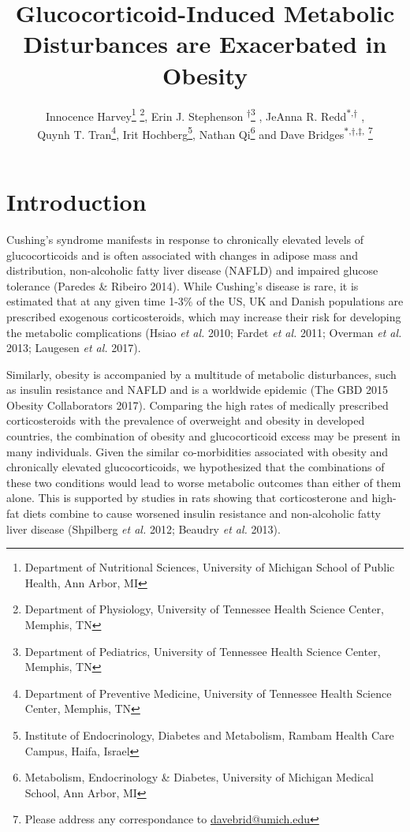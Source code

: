 \documentclass[11pt]{article} %
\date{} %
\title{Glucocorticoid-Induced Metabolic Disturbances are Exacerbated in
Obesity}
\author{Innocence Harvey\footnote{Department of Nutritional Sciences, University of Michigan School of Public Health, Ann Arbor, MI} \footnote{Department of Physiology, University of Tennessee Health Science Center, Memphis, TN}, Erin J. Stephenson \textsuperscript{$\dagger$}\footnote{Department of Pediatrics, University of Tennessee Health Science Center, Memphis, TN} , JeAnna R. Redd\textsuperscript{$\ast$,$\dagger$} ,\\ Quynh T. Tran\footnote{Department of Preventive Medicine, University of Tennessee Health Science Center, Memphis, TN},
Irit Hochberg\footnote{ Institute of Endocrinology, Diabetes and Metabolism, Rambam Health Care Campus, Haifa, Israel}, Nathan Qi\footnote{Metabolism, Endocrinology \& Diabetes, University of Michigan Medical School, Ann Arbor, MI} and Dave Bridges\textsuperscript{$\ast$,$\dagger$,$\ddagger$,} \footnote{Please address any correspondance to \href{mailto:davebrid@umich.edu}{davebrid@umich.edu}}}
\begin{document}
\maketitle


\section*{Introduction} 

Cushing's syndrome manifests in response to chronically elevated levels
of glucocorticoids and is often associated with changes in adipose mass
and distribution, non-alcoholic fatty liver disease (NAFLD) and impaired
glucose tolerance (Paredes \& Ribeiro 2014). While Cushing's disease is
rare, it is estimated that at any given time 1-3\% of the US, UK and
Danish populations are prescribed exogenous corticosteroids, which may
increase their risk for developing the metabolic complications (Hsiao
\emph{et al.} 2010; Fardet \emph{et al.} 2011; Overman \emph{et al.}
2013; Laugesen \emph{et al.} 2017).

Similarly, obesity is accompanied by a multitude of metabolic
disturbances, such as insulin resistance and NAFLD and is a worldwide
epidemic (The GBD 2015 Obesity Collaborators 2017). Comparing the high
rates of medically prescribed corticosteroids with the prevalence of
overweight and obesity in developed countries, the combination of
obesity and glucocorticoid excess may be present in many individuals.
Given the similar co-morbidities associated with obesity and chronically
elevated glucocorticoids, we hypothesized that the combinations of these
two conditions would lead to worse metabolic outcomes than either of
them alone. This is supported by studies in rats showing that
corticosterone and high-fat diets combine to cause worsened insulin
resistance and non-alcoholic fatty liver disease (Shpilberg \emph{et
al.} 2012; Beaudry \emph{et al.} 2013).
\end{document}
